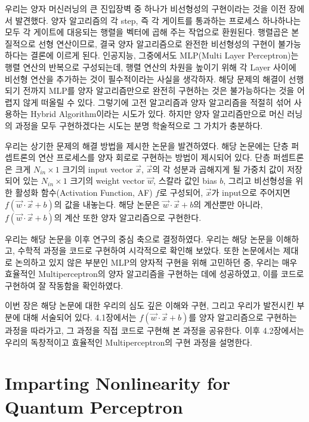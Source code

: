 우리는 양자 머신러닝의 큰 진입장벽 중 하나가 비선형성의 구현이라는 것을 이전 장에서 발견했다.
양자 알고리즘의 각 step, 즉 각 게이트를 통과하는 프로세스 하나하나는 모두 각 게이트에 대응되는 행렬을 벡터에 곱해 주는 작업으로 환원된다. 
행렬곱은 본질적으로 선형 연산이므로, 결국 양자 알고리즘으로 완전한 비선형성의 구현이 불가능하다는 결론에 이르게 된다.
인공지능, 그중에서도 MLP(Multi Layer Perceptron)는 행렬 연산의 반복으로 구성되는데, 행렬 연산의 차원을 높이기 위해 각 Layer 사이에 비선형 연산을 추가하는 것이 필수적이라는 사실을 생각하자.
해당 문제의 해결이 선행되기 전까지 MLP를 양자 알고리즘만으로 완전히 구현하는 것은 불가능하다는 것을 어렵지 않게 떠올릴 수 있다.
그렇기에 고전 알고리즘과 양자 알고리즘을 적절히 섞어 사용하는 Hybrid Algorithm이라는 시도가 있다. 하지만 양자 알고리즘만으로 머신 러닝의 과정을 모두 구현하겠다는 시도는 분명 학술적으로 그 가치가 충분하다.

우리는 상기한 문제의 해결 방법을 제시한 논문을 발견하였다.
해당 논문에는 단층 퍼셉트론의 연산 프로세스를 양자 회로로 구현하는 방법이 제시되어 있다.
단층 퍼셉트론은 크게 \(N_{in} \times 1\) 크기의 input vector \(\vec{x}\), 
\(\vec{x}\)의 각 성분과 곱해지게 될 가중치 값이 저장되어 있는 \(N_{in} \times 1\) 크기의 weight vector \(\vec{w}\), 
스칼라 값인 bias \(b\), 그리고 비선형성을 위한 활성화 함수(Activation Function, AF) \(f\)로 구성되어,
\(\vec{x}\)가 input으로 주어지면 \(f(\vec{w}\cdot\vec{x}+b)\)의 값을 내놓는다.
해당 논문은 \(\vec{w}\cdot\vec{x}+b\)의 계산뿐만 아니라, \(f(\vec{w}\cdot\vec{x}+b)\)의 계산 또한 양자 알고리즘으로 구현한다.

우리는 해당 논문을 이후 연구의 중심 축으로 결정하였다.
우리는 해당 논문을 이해하고, 수학적 과정을 코드로 구현하여 시각적으로 확인해 보았다.
또한 논문에서는 제대로 논의하고 있지 않은 부분인 MLP의 양자적 구현을 위해 고민하던 중, 우리는 매우 효율적인 Multiperceptron의 양자 알고리즘을 구현하는 데에 성공하였고, 이를 코드로 구현하여 잘 작동함을 확인하였다.

이번 장은 해당 논문에 대한 우리의 심도 깊은 이해와 구현, 그리고 우리가 발전시킨 부분에 대해 서술되어 있다.
4.1장에서는 \(f(\vec{w}\cdot\vec{x}+b)\)를 양자 알고리즘으로 구현하는 과정을 따라가고, 그 과정을 직접 코드로 구현해 본 과정을 공유한다.
이후 4.2장에서는 우리의 독창적이고 효율적인 Multiperceptron의 구현 과정을 설명한다.

\section{Imparting Nonlinearity for Quantum Perceptron}

